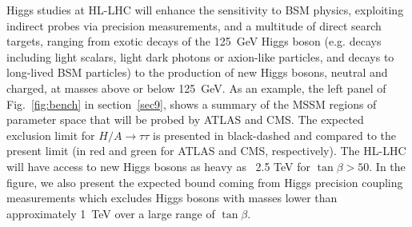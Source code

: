 \documentclass[../report.tex]{subfiles}
\begin{document}



Higgs studies at HL-LHC will enhance the sensitivity to BSM physics, exploiting indirect probes via precision measurements, and a multitude of direct search targets, ranging from exotic decays of the 125~GeV Higgs boson (e.g. decays including light scalars, light dark photons or axion-like particles, and decays to long-lived BSM particles) to the production of new Higgs bosons, neutral and charged, at masses above or below 125~GeV.
As an example, the left panel of Fig.~\ref{fig:bench} in section~\ref{sec9}, shows a summary of the MSSM regions of parameter space that will be probed by ATLAS and CMS. The expected exclusion limit for $H/A\to \tau \tau$ is presented in black-dashed and compared to the present limit (in red and green for ATLAS and CMS, respectively). The HL-LHC will have access to new Higgs bosons as heavy as ~2.5 TeV for $\tan\beta>50$. In the figure, we also present the expected bound coming from  Higgs precision coupling measurements which excludes Higgs bosons with masses lower than approximately 1~TeV over a large range of $\tan\beta$.
\end{document}
